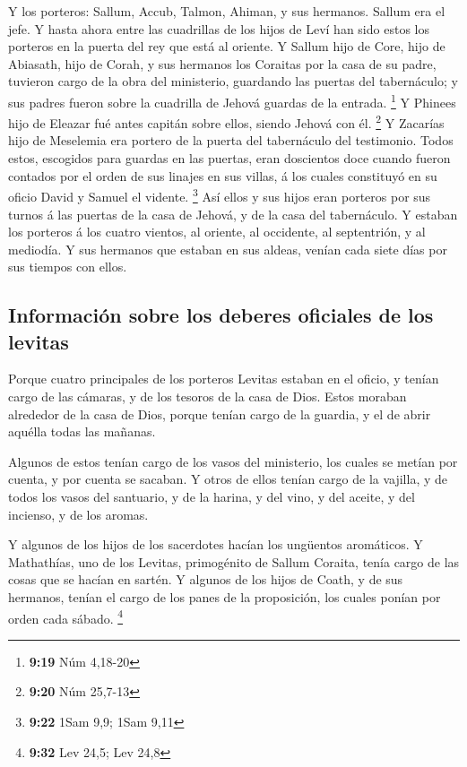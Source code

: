  Y los porteros: Sallum, Accub, Talmon, Ahiman, y sus
hermanos. Sallum era el jefe.  Y hasta ahora entre las
cuadrillas de los hijos de Leví han sido estos los porteros en la puerta
del rey que está al oriente.  Y Sallum hijo de Core, hijo
de Abiasath, hijo de Corah, y sus hermanos los Coraitas por la casa de
su padre, tuvieron cargo de la obra del ministerio, guardando las
puertas del tabernáculo; y sus padres fueron sobre la cuadrilla de
Jehová guardas de la entrada. \footnote{\textbf{9:19} Núm 4,18-20}
 Y Phinees hijo de Eleazar fué antes capitán sobre ellos,
siendo Jehová con él. \footnote{\textbf{9:20} Núm 25,7-13} 
Y Zacarías hijo de Meselemia era portero de la puerta del tabernáculo
del testimonio.  Todos estos, escogidos para guardas en las
puertas, eran doscientos doce cuando fueron contados por el orden de sus
linajes en sus villas, á los cuales constituyó en su oficio David y
Samuel el vidente. \footnote{\textbf{9:22} 1Sam 9,9; 1Sam 9,11}
 Así ellos y sus hijos eran porteros por sus turnos á las
puertas de la casa de Jehová, y de la casa del tabernáculo.
 Y estaban los porteros á los cuatro vientos, al oriente,
al occidente, al septentrión, y al mediodía.  Y sus
hermanos que estaban en sus aldeas, venían cada siete días por sus
tiempos con ellos.

\hypertarget{informaciuxf3n-sobre-los-deberes-oficiales-de-los-levitas}{%
\subsection{Información sobre los deberes oficiales de los
levitas}\label{informaciuxf3n-sobre-los-deberes-oficiales-de-los-levitas}}

 Porque cuatro principales de los porteros Levitas estaban
en el oficio, y tenían cargo de las cámaras, y de los tesoros de la casa
de Dios.  Estos moraban alrededor de la casa de Dios,
porque tenían cargo de la guardia, y el de abrir aquélla todas las
mañanas.

 Algunos de estos tenían cargo de los vasos del ministerio,
los cuales se metían por cuenta, y por cuenta se sacaban. 
Y otros de ellos tenían cargo de la vajilla, y de todos los vasos del
santuario, y de la harina, y del vino, y del aceite, y del incienso, y
de los aromas.

 Y algunos de los hijos de los sacerdotes hacían los
ungüentos aromáticos.  Y Mathathías, uno de los Levitas,
primogénito de Sallum Coraita, tenía cargo de las cosas que se hacían en
sartén.  Y algunos de los hijos de Coath, y de sus
hermanos, tenían el cargo de los panes de la proposición, los cuales
ponían por orden cada sábado. \footnote{\textbf{9:32} Lev 24,5; Lev 24,8}

